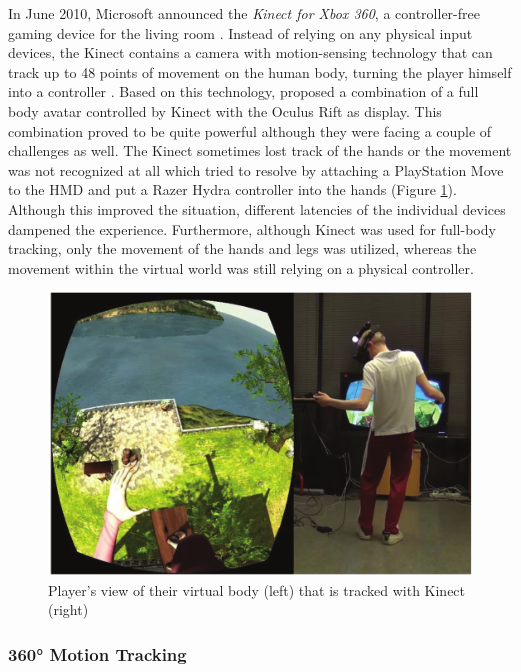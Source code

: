 In June 2010, Microsoft announced the \textit{Kinect for Xbox 360}, a controller-free gaming device for the living room \citep{Microsoft2010}. Instead of relying on any physical input devices, the Kinect contains a camera with motion-sensing technology that can track up to 48 points of movement on the human body, turning the player himself into a controller \citep{Microsoft2010}. \newline
Based on this technology, \cite{Takala2014} proposed a combination of a full body avatar controlled by Kinect with the Oculus Rift as display. This combination proved to be quite powerful although they were facing a couple of challenges as well. The Kinect sometimes lost track of the hands or the movement was not recognized at all which \cite{Takala2014} tried to resolve by attaching a PlayStation Move to the HMD and put a Razer Hydra controller into the hands (Figure \ref{fig:kinectbody}). Although this improved the situation, different latencies of the individual devices dampened the experience. Furthermore, although Kinect was used for full-body tracking, only the movement of the hands and legs was utilized, whereas the movement within the virtual world was still relying on a physical controller.
\begin{figure}[t]
	\begin{center}
		\includegraphics[width=12cm]{03_Figures/05_LitReview/Takala2014_KinectBody.png}
		\caption[Player's view of their virtual body that is tracked with Kinect]{Player's view of their virtual body (left) that is tracked with Kinect (right) \citep{Takala2014}}
		\label{fig:kinectbody}
	\end{center}
\end{figure}


\subsubsection{360° Motion Tracking}
\label{360MotionTracking}


